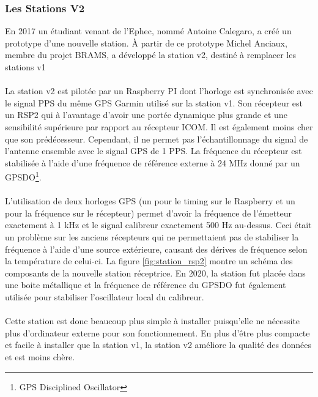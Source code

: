 \documentclass[11pt]{article}
\begin{document}
\subsubsection{Les Stations V2}

En 2017 un étudiant venant de l'Ephec, nommé Antoine Calegaro, a créé un prototype d'une nouvelle station.
À partir de ce prototype Michel Anciaux, membre du projet BRAMS, a développé la station v2, destiné à remplacer les stations v1\\
\\
La station v2 est pilotée par un Raspberry PI dont l'horloge est synchronisée avec le signal PPS du même GPS Garmin utilisé sur la station v1.
Son récepteur est un RSP2 qui à l'avantage d'avoir une portée dynamique plus grande et une sensibilité supérieure par rapport au récepteur ICOM.
Il est également moins cher que son prédécesseur.
Cependant, il ne permet pas l'échantillonnage du signal de l'antenne ensemble avec le signal GPS de 1 PPS.
La fréquence du récepteur est stabilisée à l'aide d'une fréquence de référence externe à 24 MHz donné par un GPSDO\footnote{GPS Disciplined Oscillator}.\\
\\
L'utilisation de deux horloges GPS (un pour le timing sur le Raspberry et un pour la fréquence sur le récepteur) permet d'avoir la fréquence de l'émetteur exactement à 1 kHz et le signal calibreur exactement 500 Hz au-dessus.
Ceci était un problème sur les anciens récepteurs qui ne permettaient pas de stabiliser la fréquence à l'aide d'une source extérieure, causant des dérives de fréquence selon la température de celui-ci.
La figure \ref{fig:station_rsp2} montre un schéma des composants de la nouvelle station réceptrice.
En 2020, la station fut placée dans une boite métallique et la fréquence de référence du GPSDO fut également utilisée pour stabiliser l'oscillateur local du calibreur.\\
\\
Cette station est donc beaucoup plus simple à installer puisqu'elle ne nécessite plus d'ordinateur externe pour son fonctionnement.
En plus d'être plus compacte et facile à installer que la station v1, la station v2 améliore la qualité des données et est moins chère.


\end{document}
